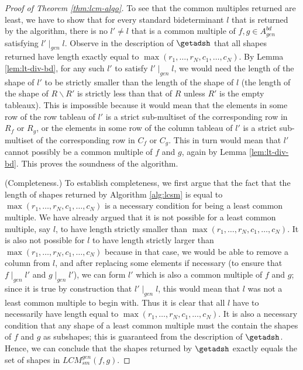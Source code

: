 \documentclass[11pt,reqno]{amsart}
\newcommand{\gendivides}{\mid_{gen}}
\newcommand{\cmlt}{CM_{sm}^{lt}}
\theoremstyle{definition}
\numberwithin{equation}{section}
\begin{document}
\begin{proof}[Proof of Theorem \ref{thm:lcm-algo}]
To see that the common multiples returned are least, we have to show that for every standard bideterminant $l$ that is returned by the algorithm, there is no $l' \neq l$ that is a common multiple of $f,g \in A^{bd}_{gen}$ satisfying $l' \gendivides l$. Observe in the description of $\getadsh$ that all shapes returned have length exactly equal to $\max(r_1, \ldots, r_N, c_1, \ldots, c_N)$. By Lemma \ref{lem:lt-div-bd}, for any such $l'$ %
to satisfy $l' \gendivides l$, we would need the length of the shape of $l'$ to be strictly smaller than the length of the shape of $l$ (the length of the shape of $R \backslash R'$ is strictly less than that of $R$ unless $R'$ is the empty tableaux). This is impossible because it would mean that the elements in some row of the row tableau of $l'$ is a strict sub-multiset of the corresponding row in $R_f$ or $R_g$, or the elements in some row of the column tableau of $l'$ is a strict sub-multiset of the corresponding row in $C_f$ or $C_g$. This in turn would mean that $l'$ cannot possibly be a common multiple of $f$ and $g$, again by Lemma \ref{lem:lt-div-bd}. This proves the soundness of the algorithm. 

(Completeness.) To establish completeness, we first argue that the fact that the length of shapes returned by Algorithm \ref{alg:lcsm} is equal to $\max(r_1, \ldots, r_N, c_1, \ldots, c_N)$ is a necessary condition for being a least common multiple. We have already argued that it is not possible for a least common multiple, say $l$, to have length strictly smaller than $\max(r_1, \ldots, r_N, c_1, \ldots, c_N)$. It is also not possible for $l$ to have length strictly larger than $\max(r_1, \ldots, r_N, c_1, \ldots, c_N)$ because in that case, we would be able to remove a column from $l$, and after replacing some elements if necessary (to ensure that $f \gendivides l'$ and $g \gendivides l'$), we can form $l'$ which is also a common multiple of $f$ and $g$; since it is true by construction that $l' \gendivides l$, this would mean that $l$ was not a least common multiple to begin with. Thus it is clear that all $l$ have to necessarily have length equal to $\max(r_1, \ldots, r_N, c_1, \ldots, c_N)$. It is also a necessary condition that any shape of a least common multiple must the contain the shapes of $f$ and $g$ as subshapes; this is guaranteed from the description of $\getadsh$. Hence, we can conclude that the shapes returned by $\getadsh$ exactly equals the set of shapes in $LCM_{sm}^{gen}(f, g)$.


\end{proof}
\end{document}
